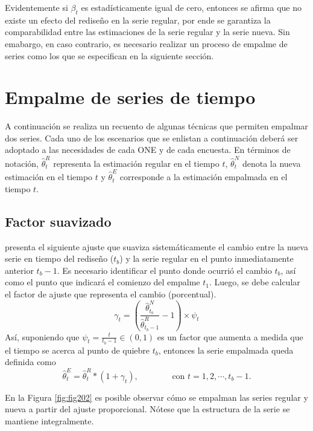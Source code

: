 \documentclass[
  12pt,
]{book}
\begin{document}
Evidentemente si \(\beta_{t}\) es estadísticamente igual de cero, entonces se afirma que no existe un efecto del rediseño en la serie regular, por ende se garantiza la comparabilidad entre las estimaciones de la serie regular y la serie nueva. Sin emabargo, en caso contrario, es necesario realizar un proceso de empalme de series como los que se especifican en la siguiente sección.

\hypertarget{empalme-de-series-de-tiempo}{%
\section{Empalme de series de tiempo}\label{empalme-de-series-de-tiempo}}

A continuación se realiza un recuento de algunas técnicas que permiten empalmar dos series. Cada uno de los escenarios que se enlistan a continuación deberá ser adoptado a las necesidades de cada ONE y de cada encuesta. En términos de notación, \(\hat \theta^{R}_t\) representa la estimación regular en el tiempo \(t\), \(\hat \theta^{N}_t\) denota la nueva estimación en el tiempo \(t\) y \(\hat \theta^{E}_t\) corresponde a la estimación empalmada en el tiempo \(t\).

\hypertarget{factor-suavizado}{%
\subsection{Factor suavizado}\label{factor-suavizado}}

\citet{DiNatale} presenta el siguiente ajuste que suaviza sistemáticamente el cambio entre la nueva serie en tiempo del rediseño (\(t_b\)) y la serie regular en el punto inmediatamente anterior \(t_b-1\). Es necesario identificar el punto donde ocurrió el cambio \(t_b\), así como el punto que indicará el comienzo del empalme \(t_1\). Luego, se debe calcular el factor de ajuste que representa el cambio (porcentual).
\[
\gamma_t=\left(\frac{\hat \theta^{N}_{t_b}}{\hat \theta^{R}_{t_b-1}} -1\right)  \times \psi_t
\]
Así, suponiendo que \(\psi_t = \frac{t}{t_b-1} \in (0,1)\) es un factor que aumenta a medida que el tiempo se acerca al punto de quiebre \(t_b\), entonces la serie empalmada queda definida como
\[
\hat \theta^{E}_t=\hat \theta^{R}_t* (1+\gamma_t),
\ \ \ \ \ \ \ \ \ \ \ \ \ \ \ \ \ \ \text{con } t=1,2,\cdots,t_b-1.
\]

En la Figura \ref{fig:fig202} es posible observar cómo se empalman las series regular y nueva a partir del ajuste proporcional. Nótese que la estructura de la serie se mantiene integralmente.
\end{document}
